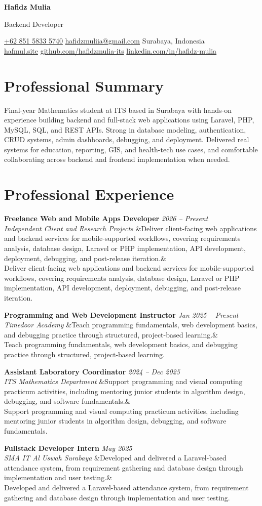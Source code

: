 \documentclass[a4paper,11pt]{article}
\newcommand{\cvname}[1]{%
  {\centering\LARGE\bfseries #1\par\vspace{2pt}}%
}
\newcommand{\cvtitle}[1]{%
  {\centering\large\color{accent} #1\par\vspace{4pt}}%
}
\newcommand{\cvcontact}[1]{%
  {\centering\small #1\par\vspace{6pt}}%
}
\newcommand{\cventry}[4]{%
  \noindent\textbf{#1} \hfill \textit{#3} \\
  \textit{#2}
  \ifx&#4& \else \\ \small #4 \fi
  \vspace{6pt}
}
\begin{document}
\cvname{Hafidz Mulia}
\cvtitle{Backend Developer}
\cvcontact{%
  \href{tel:+6285158335740}{+62 851 5833 5740} \quad\textbar\quad
  \href{mailto:hafidzmuliia@gmail.com}{hafidzmuliia@gmail.com} \quad\textbar\quad
  Surabaya, Indonesia \\
  \href{https://hafmul.site}{hafmul.site} \quad\textbar\quad
  \href{https://github.com/hafidzmulia-its}{github.com/hafidzmulia-its} \quad\textbar\quad
  \href{https://www.linkedin.com/in/hafidz-mulia/}{linkedin.com/in/hafidz-mulia}
}

\section{Professional Summary}
Final-year Mathematics student at ITS based in Surabaya with hands-on experience building backend and full-stack web applications using Laravel, PHP, MySQL, SQL, and REST APIs. Strong in database modeling, authentication, CRUD systems, admin dashboards, debugging, and deployment. Delivered real systems for education, reporting, GIS, and health-tech use cases, and comfortable collaborating across backend and frontend implementation when needed.

\section{Professional Experience}
\cventry
  {Freelance Web and Mobile Apps Developer}
  {Independent Client and Research Projects}
  {2026 -- Present}
  {Deliver client-facing web applications and backend services for mobile-supported workflows, covering requirements analysis, database design, Laravel or PHP implementation, API development, deployment, debugging, and post-release iteration.}

\cventry
  {Programming and Web Development Instructor}
  {Timedoor Academy}
  {Jan 2025 -- Present}
  {Teach programming fundamentals, web development basics, and debugging practice through structured, project-based learning.}

\cventry
  {Assistant Laboratory Coordinator}
  {ITS Mathematics Department}
  {2024 -- Dec 2025}
  {Support programming and visual computing practicum activities, including mentoring junior students in algorithm design, debugging, and software fundamentals.}

\cventry
  {Fullstack Developer Intern}
  {SMA IT Al Uswah Surabaya}
  {May 2025}
  {Developed and delivered a Laravel-based attendance system, from requirement gathering and database design through implementation and user testing.}
\end{document}
